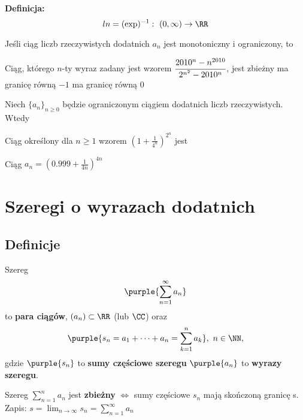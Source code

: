 \textbf{Definicja:} 
$$
ln = (\exp)^{-1}: \ (0, \infty) \to \RR
$$

\begin{problems}
    \prob Jeśli ciąg liczb rzeczywistych dodatnich $a_n$ jest monotoniczny i ograniczony, to

    \prob Ciąg, którego $n$-ty wyraz zadany jest wzorem $\cfrac{2010^n - n^{2010}}{2^{n^2}-2010^n}$,
    \answers
    {jest zbieżny}
    {ma granicę równą $-1$}
    {ma granicę równą 0}

    \prob Niech $\{a_n\}_{n \geq 0}$ będzie ograniczonym ciągiem dodatnich liczb rzeczywistych. Wtedy

    \prob Ciąg określony dla $n \geq 1$ wzorem $(1+\frac{1}{4^n})^{2^n}$ jest

    \prob Ciąg $a_n = \left(0.999 + \frac{1}{4n}\right)^{4n}$
\end{problems}

\section{Szeregi o wyrazach dodatnich}
\subsection{Definicje}
Szereg $$\purple{\sum_{n=1}^{\infty}a_n}$$ to \textbf{para ciągów}, $(a_n)\subset \RR$ (lub $\CC$) oraz $$\purple{s_n = a_1 + \dots + a_n = \sum_{k=1}^na_k}, \ n \in \NN,$$ gdzie $\purple{s_n}$ to \textbf{sumy częściowe szeregu} $\purple{a_n}$ to \textbf{wyrazy szeregu}. 

Szereg $\sum_{n=1}^na_n$ jest \textbf{zbieżny} $\Longleftrightarrow$ sumy częściowe $s_n$ mają skończoną granicę s. Zapis: $s=\lim_{n\to\infty}s_n=\sum_{n=1}^{\infty}a_n$
